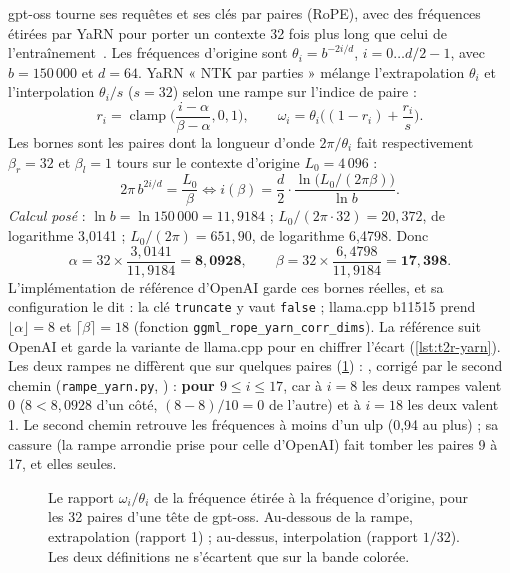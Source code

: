 gpt-oss tourne ses requêtes et ses clés par paires (RoPE), avec des fréquences étirées par YaRN pour porter un contexte 32 fois plus long que celui de l'entraînement~\cite{peng2023yarn}. Les fréquences d'origine sont $\theta_i = b^{-2i/d}$, $i = 0 \ldots d/2 - 1$, avec $b = 150\,000$ et $d = 64$. YaRN « NTK par parties » mélange l'extrapolation $\theta_i$ et l'interpolation $\theta_i/s$ ($s = 32$) selon une rampe sur l'indice de paire :
\begin{equation}\label{eq:t2r-rampe}
r_i = \operatorname{clamp}\!\Big(\frac{i - \alpha}{\beta - \alpha}, 0, 1\Big), \qquad
\omega_i = \theta_i\Big((1 - r_i) + \frac{r_i}{s}\Big).
\end{equation}
Les bornes sont les paires dont la longueur d'onde $2\pi/\theta_i$ fait respectivement $\beta_r = 32$ et $\beta_l = 1$ tours sur le contexte d'origine $L_0 = 4\,096$ :
\begin{equation}\label{eq:t2r-bornes}
2\pi\, b^{2i/d} = \frac{L_0}{\beta} \iff i(\beta) = \frac{d}{2}\cdot\frac{\ln\big(L_0/(2\pi\beta)\big)}{\ln b}.
\end{equation}
\emph{Calcul posé} \calc : $\ln b = \ln 150\,000 = 11{,}9184$ ; $L_0/(2\pi\cdot 32) = 20{,}372$, de logarithme 3,0141 ; $L_0/(2\pi) = 651{,}90$, de logarithme 6,4798. Donc
\[
\alpha = 32 \times \frac{3{,}0141}{11{,}9184} = \mathbf{8{,}0928}, \qquad \beta = 32 \times \frac{6{,}4798}{11{,}9184} = \mathbf{17{,}398}.
\]
L'implémentation de référence d'OpenAI garde ces bornes réelles, et sa configuration le dit : la clé \texttt{truncate} y vaut \texttt{false} ; llama.cpp b11515 prend $\lfloor\alpha\rfloor = 8$ et $\lceil\beta\rceil = 18$ (fonction \texttt{ggml\_rope\_\allowbreak yarn\_\allowbreak corr\_\allowbreak dims}). La référence suit OpenAI et garde la variante de llama.cpp pour en chiffrer l'écart (\cref{lst:t2r-yarn}). Les deux rampes ne diffèrent que sur quelques paires (\cref{fig:t2r-rampe}) : , corrigé par le second chemin (\texttt{rampe\_yarn.py}, ) : \textbf{pour $9 \le i \le 17$}, car à $i = 8$ les deux rampes valent 0 ($8 < 8{,}0928$ d'un côté, $(8-8)/10 = 0$ de l'autre) et à $i = 18$ les deux valent 1. Le second chemin retrouve les fréquences à moins d'un ulp (0,94 au plus) ; sa cassure (la rampe arrondie prise pour celle d'OpenAI) fait tomber les paires 9 à 17, et elles seules.

\begin{figure}[ht]
\centering
\GrapheRefRampe
\caption[La rampe de YaRN, OpenAI contre llama.cpp]{Le rapport $\omega_i/\theta_i$ de la fréquence étirée à la fréquence d'origine, pour les 32 paires d'une tête de gpt-oss. Au-dessous de la rampe, extrapolation (rapport 1) ; au-dessus, interpolation (rapport $1/32$). Les deux définitions ne s'écartent que sur la bande colorée.}
\label{fig:t2r-rampe}
\end{figure}

